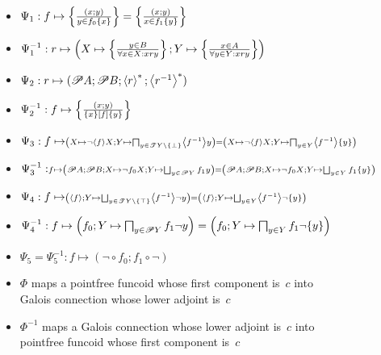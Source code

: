 \begin{thm}
\begin{figure}[ht]
\begin{itemize}
\item $\Psi_1:f\mapsto\left\{ \frac{(x;y)}{y\in f_0\{x\}}\right\}=\left\{ \frac{(x;y)}{x\in f_1\{y\}}\right\}$
\item $\Psi_1^{-1}:r\mapsto\left(X\mapsto\left\{ \frac{y\in B}{\forall x\in X:x\mathrel{r}y}\right\}; Y\mapsto\left\{ \frac{x\in A}{\forall y\in Y:x\mathrel{r}y}\right\}\right)$
\item $\Psi_2:r\mapsto(\mathscr{P} A;\mathscr{P} B;\left\langle r\right\rangle ^{\ast};\left\langle r^{-1}\right\rangle ^{\ast})$
\item $\Psi_2^{-1}:f\mapsto\left\{ \frac{(x;y)}{\{x\}\mathrel{\left[f\right]}\{y\}}\right\}$
\item $\Psi_3:f\mapsto\scriptstyle\left(X\mapsto\lnot\left\langle f\right\rangle X;Y\mapsto\bigsqcap_{y\in\mathscr{T} Y\setminus\{\bot\}}\left\langle f^{-1}\right\rangle y\right)=
\left(X\mapsto\lnot\left\langle f\right\rangle X;Y\mapsto\bigsqcap_{y\in Y}\left\langle f^{-1}\right\rangle\{y\}\right)$
\item $\Psi_3^{-1}:\scriptstyle f\mapsto\scriptstyle\left(\subsets A;\subsets B;X\mapsto\lnot f_0 X;Y\mapsto\bigsqcup_{y\in\subsets Y}f_1 y\right)=
  \left(\subsets A;\subsets B;X\mapsto\lnot f_0 X;Y\mapsto\bigsqcup_{y\in Y}f_1\{y\}\right)$
\item $\Psi_4:f\mapsto\scriptstyle\left(\supfun{f};Y\mapsto\bigsqcup_{y\in\mathscr{T}Y\setminus\{\top\}}\supfun{f^{-1}}\lnot y\right)=
  \left(\supfun{f};Y\mapsto\bigsqcup_{y\in Y}\supfun{f^{-1}}\lnot\{y\}\right)$
\item $\Psi_4^{-1}:f\mapsto\left(f_0;Y\mapsto\bigsqcap_{y\in\mathscr{P} Y}f_1\lnot y\right)=\left(f_0;Y\mapsto\bigsqcap_{y\in Y}f_1\lnot\{y\}\right)$
\item $\Psi_5=\Psi_5^{-1}:f\mapsto(\mathord{\lnot}\circ f_0;f_1\circ\mathord{\lnot})$
\item $\Phi$ maps a pointfree funcoid whose first component is~$c$ into Galois connection whose lower adjoint is~$c$
\item $\Phi^{-1}$ maps a Galois connection whose lower adjoint is~$c$ into pointfree funcoid whose first component is~$c$
\end{itemize}

\end{figure}
\end{thm}


